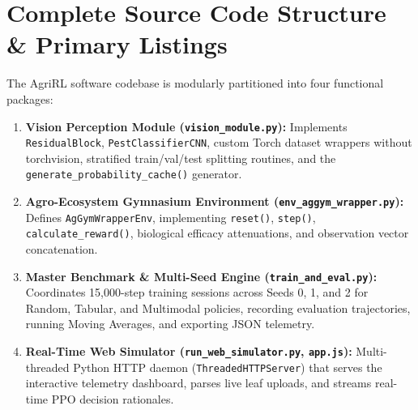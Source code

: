 \documentclass[12pt,a4paper]{report}
\begin{document}
\appendix

\chapter{Complete Source Code Structure \& Primary Listings}
The AgriRL software codebase is modularly partitioned into four functional packages:
\begin{enumerate}
    \item \textbf{Vision Perception Module (\texttt{vision\_module.py}):} Implements \texttt{ResidualBlock}, \texttt{PestClassifierCNN}, custom Torch dataset wrappers without torchvision, stratified train/val/test splitting routines, and the \texttt{generate\_probability\_cache()} generator.
    \item \textbf{Agro-Ecosystem Gymnasium Environment (\texttt{env\_aggym\_wrapper.py}):} Defines \texttt{AgGymWrapperEnv}, implementing \texttt{reset()}, \texttt{step()}, \texttt{calculate\_reward()}, biological efficacy attenuations, and observation vector concatenation.
    \item \textbf{Master Benchmark \& Multi-Seed Engine (\texttt{train\_and\_eval.py}):} Coordinates 15,000-step training sessions across Seeds 0, 1, and 2 for Random, Tabular, and Multimodal policies, recording evaluation trajectories, running Moving Averages, and exporting JSON telemetry.
    \item \textbf{Real-Time Web Simulator (\texttt{run\_web\_simulator.py}, \texttt{app.js}):} Multi-threaded Python HTTP daemon (\texttt{ThreadedHTTPServer}) that serves the interactive telemetry dashboard, parses live leaf uploads, and streams real-time PPO decision rationales.
\end{enumerate}
\end{document}
